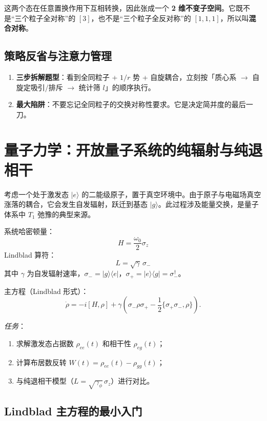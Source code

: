 这两个态在任意置换作用下互相转换，因此张成一个 \textbf{2 维不变子空间}。它既不是``三个粒子全对称''的 $[3]$，也不是``三个粒子全反对称''的 $[1,1,1]$，所以叫\textbf{混合对称}。

\subsection{策略反省与注意力管理}

\begin{enumerate}[nosep]
    \item \textbf{三步拆解题型}：看到全同粒子 + $1/r$ 势 + 自旋耦合，立刻按「质心系 $\to$ 自旋定吸引/排斥 $\to$ 统计筛 $l$」的顺序执行。
    \item \textbf{最大陷阱}：不要忘记全同粒子的交换对称性要求。它是决定简并度的最后一刀。
\end{enumerate}

\newpage
\section{量子力学：开放量子系统的纯辐射与纯退相干}

\begin{modelbox}[二能级原子在真空中的自发辐射]
考虑一个处于激发态 $|e\rangle$ 的二能级原子，置于真空环境中。由于原子与电磁场真空涨落的耦合，它会发生自发辐射，跃迁到基态 $|g\rangle$。此过程涉及能量交换，是量子体系中 $T_1$ 弛豫的典型来源。

系统哈密顿量：
\[
H = \frac{\omega_0}{2}\sigma_z
\]
Lindblad 算符：
\[
L = \sqrt{\gamma}\,\sigma_-
\]
其中 $\gamma$ 为自发辐射速率，$\sigma_- = |g\rangle\langle e|$，$\sigma_+ = |e\rangle\langle g| = \sigma_-^\dagger$。

主方程（Lindblad 形式）：
\[
\dot{\rho} = -i[H, \rho] + \gamma\left( \sigma_- \rho \sigma_+ - \frac{1}{2}\{ \sigma_+ \sigma_-, \rho \} \right).
\]

\textit{任务}：
\begin{enumerate}[nosep]
    \item 求解激发态占据数 $\rho_{ee}(t)$ 和相干性 $\rho_{eg}(t)$；
    \item 计算布居数反转 $W(t) = \rho_{ee}(t) - \rho_{gg}(t)$；
    \item 与纯退相干模型（$L = \sqrt{\gamma_\phi}\,\sigma_z$）进行对比。
\end{enumerate}
\end{modelbox}

\subsection{Lindblad 主方程的最小入门}

